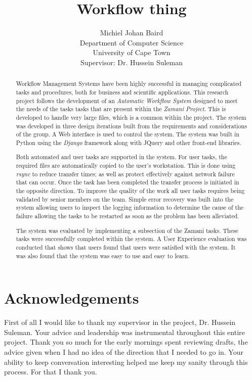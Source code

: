 \documentclass[12pt,a4paper]{report}
\title{Workflow thing}
\author{Michiel Johan Baird \\
        Department of Computer Science \\
        University of Cape Town
    \\   \small{Supervisor: Dr. Hussein Suleman} }
\begin{document}

\begin{abstract}
Workflow Management Systems have been highly successful in managing complicated
tasks and procedures, both for business and scientific applications. This
research project follows the development of an \emph{Automatic Workflow System}
designed to meet the needs of the tasks tasks that are present within the
\emph{Zamani Project}. This is developed to handle very large files, which is a
common within the project. The system was developed in three design iterations
built from the requirements and considerations of the group. A Web interface
is used to control the system. The system was built in Python using the \emph{Django}
framework along with JQuery and other front-end libraries.

Both automated and user tasks are supported in the system. For user tasks, the
required files are automatically copied to the user's workstation. This is done
using \emph{rsync} to reduce transfer times; as well as protect effectively
against network failure that can occur. Once the task has been completed the
transfer process is initiated in the opposite direction. To improve
the quality of the work all user tasks requires being validated by senior
members on the team. Simple error recovery was built into the system allowing
users to inspect the logging information to determine the cause of the failure
allowing the tasks to be restarted as soon as the problem has been alleviated.

The system was evaluated by implementing a subsection of the Zamani tasks.
These tasks were successfully completed within the system. A User
Experience evaluation was conducted that shows that users found that users were
satisfied with the system. It was also found that the system was easy to use and
easy to learn.


\end{abstract}
\chapter*{Acknowledgements}
First of all I would like to thank my supervisor in the project, Dr. Hussein
Suleman. Your advice and leadership was instrumental throughout this entire
project. Thank you so much for the early mornings spent reviewing drafts, the
advice given when I had no idea of the direction that I needed to go in. Your
ability to keep conversation interesting helped me keep my sanity through this
process. For that I thank you.
\end{document}
